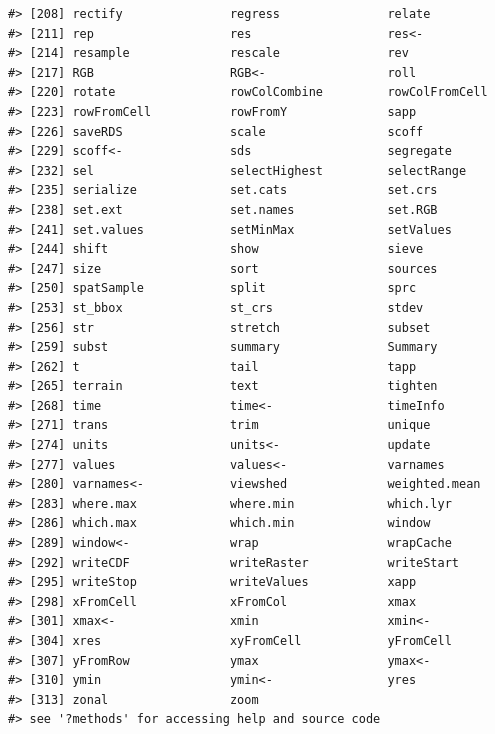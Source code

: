 \documentclass[
]{book}
\begin{document}
\begin{verbatim}
#> [208] rectify               regress               relate               
#> [211] rep                   res                   res<-                
#> [214] resample              rescale               rev                  
#> [217] RGB                   RGB<-                 roll                 
#> [220] rotate                rowColCombine         rowColFromCell       
#> [223] rowFromCell           rowFromY              sapp                 
#> [226] saveRDS               scale                 scoff                
#> [229] scoff<-               sds                   segregate            
#> [232] sel                   selectHighest         selectRange          
#> [235] serialize             set.cats              set.crs              
#> [238] set.ext               set.names             set.RGB              
#> [241] set.values            setMinMax             setValues            
#> [244] shift                 show                  sieve                
#> [247] size                  sort                  sources              
#> [250] spatSample            split                 sprc                 
#> [253] st_bbox               st_crs                stdev                
#> [256] str                   stretch               subset               
#> [259] subst                 summary               Summary              
#> [262] t                     tail                  tapp                 
#> [265] terrain               text                  tighten              
#> [268] time                  time<-                timeInfo             
#> [271] trans                 trim                  unique               
#> [274] units                 units<-               update               
#> [277] values                values<-              varnames             
#> [280] varnames<-            viewshed              weighted.mean        
#> [283] where.max             where.min             which.lyr            
#> [286] which.max             which.min             window               
#> [289] window<-              wrap                  wrapCache            
#> [292] writeCDF              writeRaster           writeStart           
#> [295] writeStop             writeValues           xapp                 
#> [298] xFromCell             xFromCol              xmax                 
#> [301] xmax<-                xmin                  xmin<-               
#> [304] xres                  xyFromCell            yFromCell            
#> [307] yFromRow              ymax                  ymax<-               
#> [310] ymin                  ymin<-                yres                 
#> [313] zonal                 zoom                 
#> see '?methods' for accessing help and source code
\end{verbatim}
\end{document}
